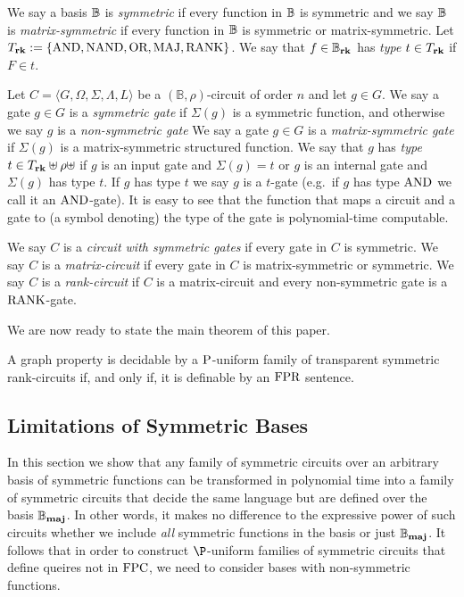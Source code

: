 \documentclass[../main/thesis.tex]{subfiles}
\begin{document}
We say a basis $\mathbb{B}$ is \emph{symmetric} if every function in $\mathbb{B}$ is symmetric
and we say $\mathbb{B}$ is \emph{matrix-symmetric} if every function in $\mathbb{B}$ is
symmetric or matrix-symmetric. Let $T_{\text{\textbf{rk}}} := \{\text{\upshape AND}, \text{\upshape NAND}, \text{\upshape OR}, \text{\upshape MAJ},
\text{\upshape RANK}\}$. We say that $f \in \mathbb{B}_{\text{\textbf{rk}}}$ has \emph{type} $t \in T_{\text{\textbf{rk}}}$ if $F \in
t$.

Let $C = \langle G, \Omega, \Sigma, \Lambda, L \rangle$ be a $(\mathbb{B},
\rho)$-circuit of order $n$ and let $g \in G$. We say a gate $g \in G$ is a
\emph{symmetric gate} if $\Sigma(g)$ is a symmetric function, and otherwise we
say $g$ is a \emph{non-symmetric gate} We say a gate $g \in G$ is a
\emph{matrix-symmetric gate} if $\Sigma(g)$ is a matrix-symmetric structured
function. We say that $g$ has \emph{type} $t \in T_{\text{\textbf{rk}}} \uplus \rho \uplus$
if $g$ is an input gate and $\Sigma (g) = t$ or $g$ is an internal gate and
$\Sigma (g)$ has type $t$. If $g$ has type $t$ we say $g$ is a $t$-gate (e.g.\
if $g$ has type $\text{\upshape AND}$ we call it an $\text{\upshape AND}$-gate). It is easy to see that the
function that maps a circuit and a gate to (a symbol denoting) the type of the
gate is polynomial-time computable.

We say $C$ is a \emph{circuit with symmetric gates} if every gate in $C$ is
symmetric. We say $C$ is a \emph{matrix-circuit} if every gate in $C$ is
matrix-symmetric or symmetric. We say $C$ is a \emph{rank-circuit} if $C$ is a
matrix-circuit and every non-symmetric gate is a $\text{\upshape RANK}$-gate.

We are now ready to state the main theorem of this paper.

\begin{thm}
  A graph property is decidable by a $\mathrm{P}$-uniform family of transparent
  symmetric rank-circuits if, and only if, it is definable by an $\text{\upshape FPR}$
  sentence.
\end{thm}

\subsection{Limitations of Symmetric Bases}
In this section we show that any family of symmetric circuits over an arbitrary
basis of symmetric functions can be transformed in polynomial time into a family
of symmetric circuits that decide the same language but are defined over the
basis $\mathbb{B}_{\text{\textbf{maj}}}$. In other words, it makes no difference to the expressive power of
such circuits whether we include \emph{all} symmetric functions in the basis or
just $\mathbb{B}_{\text{\textbf{maj}}}$. It follows that in order to construct $\P$-uniform families of
symmetric circuits that define queires not in $\text{\upshape FPC}$, we need to consider bases
with non-symmetric functions.
\end{document}
